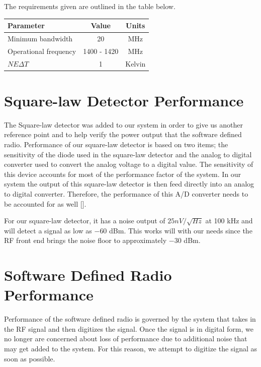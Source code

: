 The requirements given are outlined in the table below.

\begin{table}[h!tb] \centering
{}
\label{rad_performance}
\begin{tabular}{lcc} \hline
\textbf{Parameter} & \textbf{Value} & \textbf{Units} \\ \hline
Minimum bandwidth & 20 & MHz \\
Operational frequency & 1400 - 1420 & MHz \\
$NE\Delta T$ & 1 & Kelvin \\ \hline
\end{tabular}
\end{table}





\section{Square-law Detector Performance}
The Square-law detector was added to our system in order to give us another reference point and to help verify the power output that the software defined radio.  Performance of our square-law detector is based on two items; the sensitivity of the diode used in the square-law detector and the analog to digital converter used to convert the analog voltage to a digital value.  The sensitivity of this device accounts for most of the performance factor of the system.  In our system the output of this square-law detector is then feed directly into an analog to digital converter.  Therefore, the performance of this A/D converter needs to be accounted for as well [\cite{Terlep}].  

For our square-law detector, it has a noise output of $25nV/ \sqrt{Hz}$ at 100 kHz and will detect a signal as low as $-60$ dBm.  This works will with our needs since the RF front end brings the noise floor to approximately $-30$ dBm.


\section{Software Defined Radio Performance}
Performance of the software defined radio is governed by the system that takes in the RF signal and then digitizes the signal.  Once the signal is in digital form, we no longer are concerned about loss of performance due to additional noise that may get added to the system.  For this reason, we attempt to digitize the signal as soon as possible.

